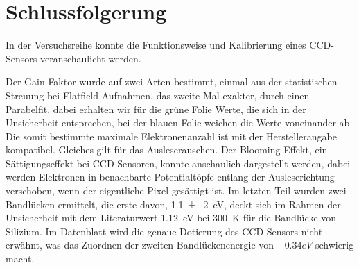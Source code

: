 \section{Schlussfolgerung}
In der Versuchsreihe konnte die Funktionsweise und Kalibrierung eines CCD-Sensors veranschaulicht werden. 

Der Gain-Faktor wurde auf zwei Arten bestimmt, einmal aus der statistischen Streuung bei Flatfield Aufnahmen, das zweite Mal exakter, durch einen Parabelfit. dabei erhalten wir für die grüne Folie Werte, die sich in der Unsicherheit entsprechen, bei der blauen Folie weichen die Werte voneinander ab. Die somit bestimmte maximale Elektronenanzahl ist mit der Herstellerangabe kompatibel. Gleiches gilt für das Ausleserauschen.
Der Blooming-Effekt, ein Sättigungseffekt bei CCD-Sensoren, konnte anschaulich dargestellt werden, dabei werden Elektronen in benachbarte Potentialtöpfe entlang der Ausleserichtung verschoben, wenn der eigentliche Pixel gesättigt ist. 
Im letzten Teil wurden zwei Bandlücken ermittelt, die erste davon, \SI{1.1(2)}{eV}, deckt sich im Rahmen der Unsicherheit mit dem Literaturwert \SI{1.12}{eV} bei \SI{300}{K} \autocite{bandluecke} für die Bandlücke von Silizium. Im Datenblatt wird die genaue Dotierung des CCD-Sensors nicht erwähnt, was das Zuordnen der zweiten Bandlückenenergie von $-0.34 \unit{eV}$ schwierig macht.